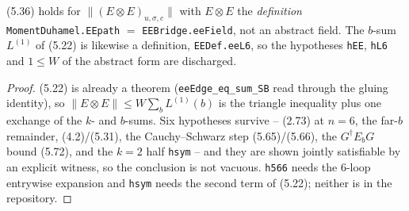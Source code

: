 \begin{lemma}\label{lem:5.7c}
  \leanok{}
  (5.36) holds for $\|(E\otimes E)_{u,\sigma,c}\|$ with $E\otimes E$ the \emph{definition}
  \texttt{MomentDuhamel.EEpath} $=$ \texttt{EEBridge.eeField}, not an abstract field.  The
  $b$-sum $L^{(1)}$ of (5.22) is likewise a definition, \texttt{EEDef.eeL6}, so the hypotheses
  \texttt{hEE}, \texttt{hL6} and $1\le W$ of the abstract form are discharged.
\end{lemma}
\begin{proof}\leanok
  (5.22) is already a theorem (\texttt{eeEdge\_eq\_sum\_SB} read through the gluing identity), so
  $\|E\otimes E\|\le W\sum_b L^{(1)}(b)$ is the triangle inequality plus one exchange of the $k$-
  and $b$-sums.  Six hypotheses survive -- (2.73) at $n=6$, the far-$b$ remainder, (4.2)/(5.31),
  the Cauchy--Schwarz step (5.65)/(5.66), the $G^\dagger E_bG$ bound (5.72), and the $k=2$ half
  \texttt{hsym} -- and they are shown jointly satisfiable by an explicit witness, so the
  conclusion is not vacuous.  \texttt{h566} needs the $6$-loop entrywise expansion and
  \texttt{hsym} needs the second term of (5.22); neither is in the repository.
\end{proof}

